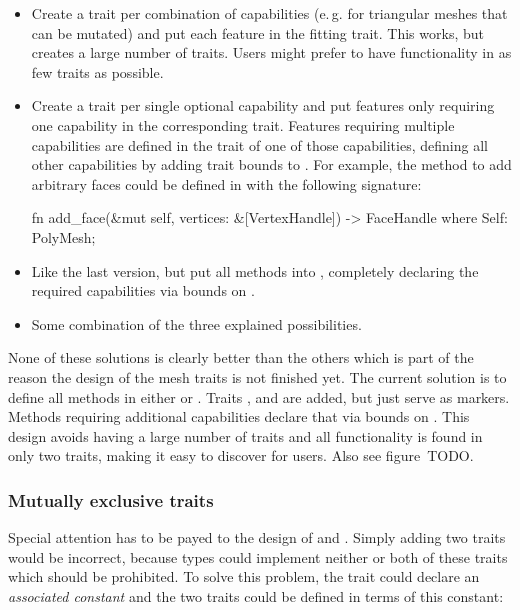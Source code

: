 \begin{itemize}
  \item Create a trait per combination of capabilities (e.\,g.  for triangular meshes that can be mutated) and put each feature in the fitting trait.
  This works, but creates a large number of traits.
  Users might prefer to have functionality in as few traits as possible.
  \item Create a trait per single optional capability and put features only requiring one capability in the corresponding trait.
  Features requiring multiple capabilities are defined in the trait of one of those capabilities, defining all other capabilities by adding trait bounds to .
  For example, the method to add arbitrary faces could be defined in  with the following signature:

  \begin{rustcode}
    fn add_face(&mut self, vertices: &[VertexHandle]) -> FaceHandle
    where
        Self: PolyMesh;
  \end{rustcode}

  \item Like the last version, but put all methods into , completely declaring the required capabilities via bounds on .
  \item Some combination of the three explained possibilities.
\end{itemize}

None of these solutions is clearly better than the others which is part of the reason the design of the mesh traits is not finished yet.
The current solution is to define all methods in either  or .
Traits ,  and  are added, but just serve as markers.
Methods requiring additional capabilities declare that via bounds on .
This design avoids having a large number of traits and all functionality is found in only two traits, making it easy to discover for users.
Also see figure~TODO.

\subsubsection*{Mutually exclusive traits}

Special attention has to be payed to the design of  and .
Simply adding two traits would be incorrect, because types could implement neither or both of these traits which should be prohibited.
To solve this problem, the trait  could declare an \emph{associated constant} and the two traits could be defined in terms of this constant:

